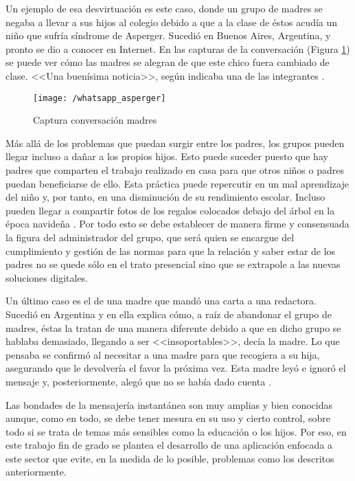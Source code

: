\newpage

Un ejemplo de esa desvirtuación es este caso, donde un grupo de madres se negaba a llevar a sus hijos al colegio debido a que a la clase de éstos acudía un niño que sufría síndrome de Asperger. Sucedió en Buenos Aires, Argentina, y pronto se dio a conocer en Internet.
En las capturas de la conversación (Figura \ref{fig:whatasper}) se puede ver cómo las madres se alegran de que este chico fuera cambiado de clase. <<Una buenísima noticia>>, según indicaba una de las integrantes \cite{Vanguardia2017}.

\begin{figure}[!h]
	\begin{center}
		\texttt{[image: /whatsapp\_asperger]}
		\caption{Captura conversación madres}
		\label{fig:whatasper}
	\end{center}
\end{figure}

Más allá de los problemas que puedan surgir entre los padres, los grupos pueden llegar incluso a dañar a los propios hijos. Esto puede suceder puesto que hay padres que comparten el trabajo realizado en casa para que otros niños o padres puedan beneficiarse de ello. Esta práctica puede repercutir en un mal aprendizaje del niño y, por tanto, en una disminución de su rendimiento escolar. Incluso pueden llegar a compartir fotos de los regalos colocados debajo del árbol en la época navideña \cite{Alias2017}. Por todo esto se debe establecer de manera firme y consensuada la figura del administrador del grupo, que será quien se encargue del cumplimiento y gestión de las normas para que la relación y saber estar de los padres no se quede sólo en el trato presencial sino que se extrapole a las nuevas soluciones digitales.

Un último caso es el de una madre que mandó una carta a una redactora. Sucedió en Argentina y en ella explica cómo, a raíz de abandonar el grupo de madres, éstas la tratan de una manera diferente debido a que en dicho grupo se hablaba demasiado, llegando a ser <<insoportables>>, decía la madre. Lo que pensaba se confirmó al necesitar a una madre para que recogiera a su hija, asegurando que le devolvería el favor la próxima vez. Esta madre leyó e ignoró el mensaje y, posteriormente, alegó que no se había dado cuenta \cite{Consuelo2017}.

\newpage

Las bondades de la mensajería instantánea son muy amplias y bien conocidas aunque, como en todo, se debe tener mesura en su uso y cierto control, sobre todo si se trata de temas más sensibles como la educación o los hijos. Por eso, en este trabajo fin de grado se plantea el desarrollo de una aplicación enfocada a este sector que evite, en la medida de lo posible, problemas como los descritos anteriormente.

